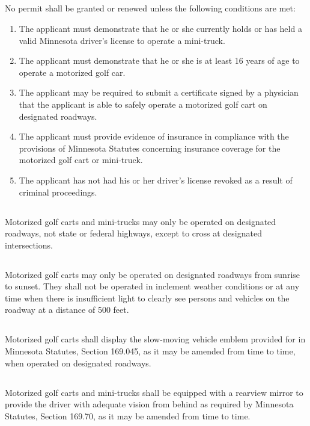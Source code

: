 \subsection{}
No permit shall be granted or renewed unless the following conditions are met:
\begin{enumerate}[{\indent}1)]
    \item The applicant must demonstrate that he or she currently holds or has held a valid Minnesota driver’s license to operate a mini-truck.
    \item The applicant must demonstrate that he or she is at least 16 years of age to operate a motorized golf car.
    \item The applicant may be required to submit a certificate signed by a physician that the applicant is able to safely operate a motorized golf cart on designated roadways.
    \item The applicant must provide evidence of insurance in compliance with the provisions of Minnesota Statutes concerning insurance coverage for the motorized golf cart or mini-truck.
    \item The applicant has not had his or her driver’s license revoked as a result of criminal proceedings.
\end{enumerate}
\subsection{}
Motorized golf carts and mini-trucks may only be operated on designated roadways, not state or federal highways, except to cross at designated intersections.
\subsection{}
Motorized golf carts may only be operated on designated roadways from sunrise to sunset.  They shall not be operated in inclement weather conditions or at any time when there is insufficient light to clearly see persons and vehicles on the roadway at a distance of 500 feet.
\subsection{}
Motorized golf carts shall display the slow-moving vehicle emblem provided for in Minnesota Statutes, Section 169.045, as it may be amended from time to time, when operated on designated roadways.
\subsection{}
Motorized golf carts and mini-trucks shall be equipped with a rearview mirror to provide the driver with adequate vision from behind as required by Minnesota Statutes, Section 169.70, as it may be amended from time to time.
